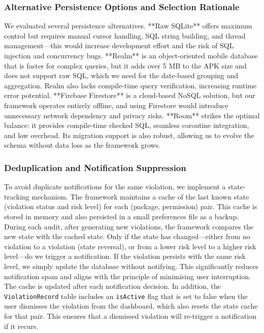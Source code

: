 \subsubsection{Alternative Persistence Options and Selection Rationale}

We evaluated several persistence alternatives. **Raw SQLite** offers maximum control but requires manual cursor handling, SQL string building, and thread management—this would increase development effort and the risk of SQL injection and concurrency bugs. **Realm** is an object-oriented mobile database that is faster for complex queries, but it adds over 5 MB to the APK size and does not support raw SQL, which we need for the date-based grouping and aggregation. Realm also lacks compile-time query verification, increasing runtime error potential. **Firebase Firestore** is a cloud-based NoSQL solution, but our framework operates entirely offline, and using Firestore would introduce unnecessary network dependency and privacy risks. **Room** strikes the optimal balance: it provides compile-time checked SQL, seamless coroutine integration, and low overhead. Its migration support is also robust, allowing us to evolve the schema without data loss as the framework grows.

\subsubsection{Deduplication and Notification Suppression}

To avoid duplicate notifications for the same violation, we implement a state-tracking mechanism. The framework maintains a cache of the last known state (violation status and risk level) for each (package, permission) pair. This cache is stored in memory and also persisted in a small preferences file as a backup. During each audit, after generating new violations, the framework compares the new state with the cached state. Only if the state has changed—either from no violation to a violation (state reversal), or from a lower risk level to a higher risk level—do we trigger a notification. If the violation persists with the same risk level, we simply update the database without notifying. This significantly reduces notification spam and aligns with the principle of minimising user interruption. The cache is updated after each notification decision. In addition, the \texttt{ViolationRecord} table includes an \texttt{isActive} flag that is set to false when the user dismisses the violation from the dashboard, which also resets the state cache for that pair. This ensures that a dismissed violation will re-trigger a notification if it recurs.

